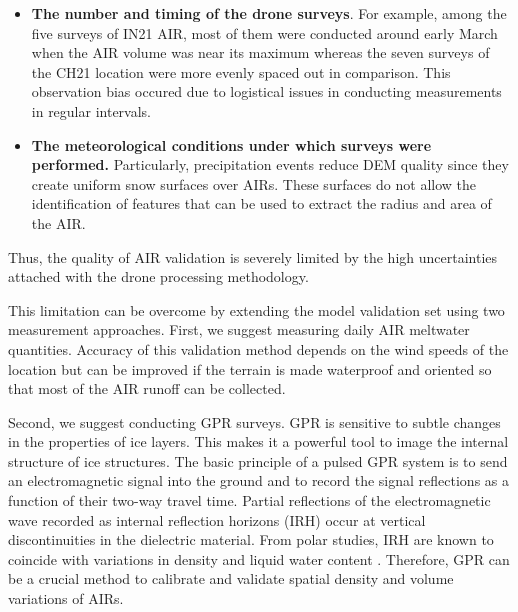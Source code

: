 \begin{itemize}
	\item \textbf{The number and timing of the drone surveys}. For example, among the five surveys of IN21 AIR, most of them were
	      conducted around early March when the AIR volume was near its maximum whereas the seven surveys of the CH21
	      location were more evenly spaced out in comparison. This observation bias occured due to logistical issues
	      in conducting measurements in regular intervals.

	\item \textbf{The meteorological conditions under which surveys were performed.} Particularly, precipitation events reduce DEM quality since
	      they create uniform snow surfaces over \ac{AIRs}. These surfaces do not allow the identification of features
	      that can be used to extract the radius and area of the AIR.

\end{itemize}

Thus, the quality of AIR validation is severely limited by the high uncertainties attached with the drone
processing methodology.

This limitation can be overcome by extending the model validation set using two measurement approaches. First,
we suggest measuring daily AIR meltwater quantities. Accuracy of this validation method depends on the wind
speeds of the location but can be improved if the terrain is made waterproof and oriented so that most of the
AIR runoff can be collected. 

Second, we suggest conducting \ac{GPR} surveys. \ac{GPR} is sensitive to subtle changes in the properties of ice
layers. This makes it a powerful tool to image the internal structure of ice structures. The basic principle of
a pulsed \ac{GPR} system is to send an electromagnetic signal into the ground and to record the signal
reflections as a function of their two-way travel time. Partial reflections of the electromagnetic wave recorded
as internal reflection horizons (IRH) occur at vertical discontinuities in the dielectric material. From polar
studies, IRH are known to coincide with variations in density and liquid water content
\citep{forster2014extensive}. Therefore, \ac{GPR} can be a crucial method to calibrate and validate spatial
density and volume variations of \ac{AIRs}.


